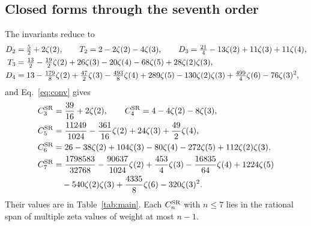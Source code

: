\documentclass[11pt,a4paper]{article}
\numberwithin{equation}{section}
\newcommand{\CSR}{C^{\rm SR}}
\begin{document}
\subsection{Closed forms through the seventh order}\label{sec:closed}
The invariants reduce to
\begin{align}
 D_2&=\tfrac52+2\zeta(2),\qquad T_2=2-2\zeta(2)-4\zeta(3),\qquad
 D_3=\tfrac{21}{4}-13\zeta(2)+11\zeta(3)+11\zeta(4),\notag\\
 T_3&=\tfrac{13}{2}-\tfrac{19}{2}\zeta(2)+26\zeta(3)-20\zeta(4)-68\zeta(5)+28\zeta(2)\zeta(3),\\
 D_4&=13-\tfrac{179}{8}\zeta(2)+\tfrac{47}{2}\zeta(3)-\tfrac{493}{8}\zeta(4)+289\zeta(5)-130\zeta(2)\zeta(3)
 +\tfrac{499}{4}\zeta(6)-76\zeta(3)^2,\notag
\end{align}
and Eq.~\eqref{eq:conv} gives
\begin{equation}
\begin{aligned}
 \CSR_3&=\frac{39}{16}+2\zeta(2),\qquad \CSR_4=4-4\zeta(2)-8\zeta(3),\\
 \CSR_5&=\frac{11249}{1024}-\frac{361}{16}\zeta(2)+24\zeta(3)+\frac{49}{2}\zeta(4),\\
 \CSR_6&=26-38\zeta(2)+104\zeta(3)-80\zeta(4)-272\zeta(5)+112\zeta(2)\zeta(3),\\
 \CSR_7&=\frac{1798583}{32768}-\frac{90637}{1024}\zeta(2)+\frac{453}{4}\zeta(3)-\frac{16835}{64}\zeta(4)+1224\zeta(5)\\
 &\quad-540\zeta(2)\zeta(3)+\frac{4335}{8}\zeta(6)-320\zeta(3)^2.
\end{aligned}
\label{eq:closed}
\end{equation}
Their values are in Table~\ref{tab:main}. Each $\CSR_n$ with $n\le7$ lies in the rational span of multiple zeta
values of weight at most $n-1$.
\end{document}
